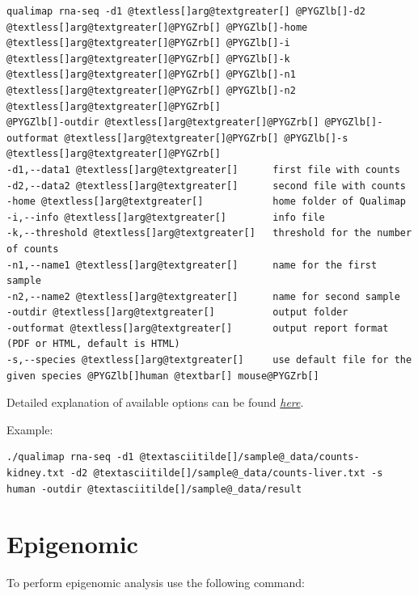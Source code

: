\documentclass[a4paper,10pt,english]{sphinxmanual}
\begin{document}
\begin{Verbatim}[commandchars=@\[\]]
qualimap rna-seq -d1 @textless[]arg@textgreater[] @PYGZlb[]-d2 @textless[]arg@textgreater[]@PYGZrb[] @PYGZlb[]-home @textless[]arg@textgreater[]@PYGZrb[] @PYGZlb[]-i @textless[]arg@textgreater[]@PYGZrb[] @PYGZlb[]-k @textless[]arg@textgreater[]@PYGZrb[] @PYGZlb[]-n1 @textless[]arg@textgreater[]@PYGZrb[] @PYGZlb[]-n2 @textless[]arg@textgreater[]@PYGZrb[]
@PYGZlb[]-outdir @textless[]arg@textgreater[]@PYGZrb[] @PYGZlb[]-outformat @textless[]arg@textgreater[]@PYGZrb[] @PYGZlb[]-s @textless[]arg@textgreater[]@PYGZrb[]
-d1,--data1 @textless[]arg@textgreater[]      first file with counts
-d2,--data2 @textless[]arg@textgreater[]      second file with counts
-home @textless[]arg@textgreater[]            home folder of Qualimap
-i,--info @textless[]arg@textgreater[]        info file
-k,--threshold @textless[]arg@textgreater[]   threshold for the number of counts
-n1,--name1 @textless[]arg@textgreater[]      name for the first sample
-n2,--name2 @textless[]arg@textgreater[]      name for second sample
-outdir @textless[]arg@textgreater[]          output folder
-outformat @textless[]arg@textgreater[]       output report format (PDF or HTML, default is HTML)
-s,--species @textless[]arg@textgreater[]     use default file for the given species @PYGZlb[]human @textbar[] mouse@PYGZrb[]
\end{Verbatim}

\begin{DUlineblock}{0em}
\item[] 
\item[] Detailed explanation of available options can be found {\hyperref[analysis:rna-seq]{\emph{here}}}.
\end{DUlineblock}

Example:

\begin{Verbatim}[commandchars=@\[\]]
./qualimap rna-seq -d1 @textasciitilde[]/sample@_data/counts-kidney.txt -d2 @textasciitilde[]/sample@_data/counts-liver.txt -s human -outdir @textasciitilde[]/sample@_data/result
\end{Verbatim}


\section{Epigenomic}
\label{command_line:epigenomic}\label{command_line:cmdline-epigenomic}
To perform epigenomic analysis use the following command:
\end{document}
